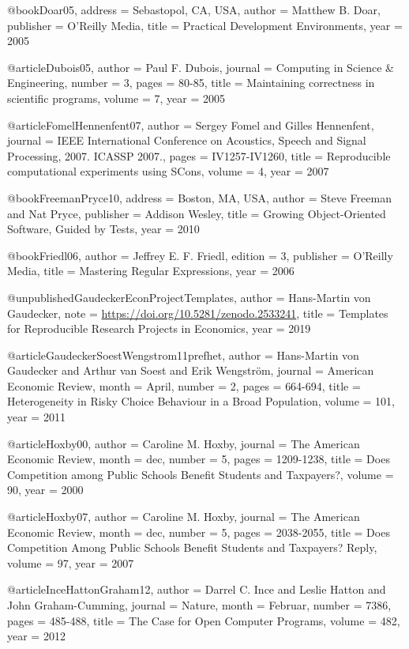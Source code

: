 @book{Doar05,
address   = {Sebastopol, {CA, USA}},
author    = {Matthew B. Doar},
publisher = {O'Reilly Media},
title     = {Practical Development Environments},
year      = {2005}
}

@article{Dubois05,
author  = {Paul F. Dubois},
journal = {Computing in Science \& Engineering},
number  = {3},
pages   = {80-85},
title   = {Maintaining correctness in scientific programs},
volume  = {7},
year    = {2005}
}

@article{FomelHennenfent07,
author  = {Sergey Fomel and Gilles Hennenfent},
journal = {IEEE International Conference on Acoustics, Speech and Signal Processing, 2007. ICASSP 2007.},
pages   = {IV1257-IV1260},
title   = {Reproducible computational experiments using {SCons}},
volume  = {4},
year    = {2007}
}

@book{FreemanPryce10,
address   = {Boston, MA, USA},
author    = {Steve Freeman and Nat Pryce},
publisher = {Addison Wesley},
title     = {Growing Object-Oriented Software, Guided by Tests},
year      = {2010}
}

@book{Friedl06,
author    = {Jeffrey E. F. Friedl},
edition   = {3},
publisher = {O'Reilly Media},
title     = {Mastering Regular Expressions},
year      = {2006}
}

@unpublished{GaudeckerEconProjectTemplates,
author = {Hans-Martin von Gaudecker},
note   = {\url{https://doi.org/10.5281/zenodo.2533241}},
title  = {Templates for Reproducible Research Projects in Economics},
year   = {2019}
}

@article{GaudeckerSoestWengstrom11prefhet,
author  = {Hans-Martin von Gaudecker and Arthur van Soest and Erik Wengström},
journal = {American Economic Review},
month   = {April},
number  = {2},
pages   = {664-694},
title   = {Heterogeneity in Risky Choice Behaviour in a Broad Population},
volume  = {101},
year    = {2011}
}

@article{Hoxby00,
author  = {Caroline M. Hoxby},
journal = {The American Economic Review},
month   = dec,
number  = {5},
pages   = {1209-1238},
title   = {Does Competition among Public Schools Benefit Students and Taxpayers?},
volume  = {90},
year    = {2000}
}

@article{Hoxby07,
author  = {Caroline M. Hoxby},
journal = {The American Economic Review},
month   = dec,
number  = {5},
pages   = {2038-2055},
title   = {Does Competition Among Public Schools Benefit Students and Taxpayers? {Reply}},
volume  = {97},
year    = {2007}
}

@article{InceHattonGraham12,
author  = {Darrel C. Ince and Leslie Hatton and John Graham-Cumming},
journal = {Nature},
month   = {Februar},
number  = {7386},
pages   = {485-488},
title   = {The Case for Open Computer Programs},
volume  = {482},
year    = {2012}
}

